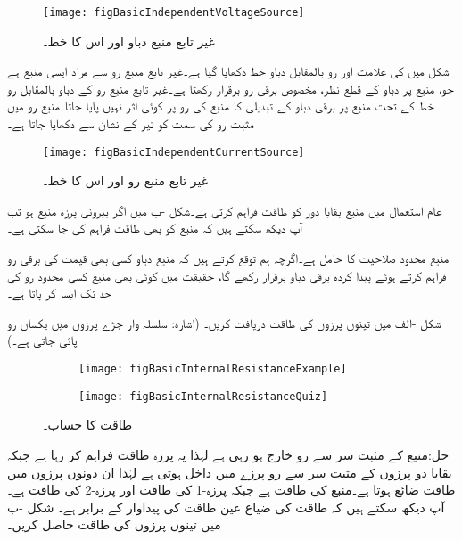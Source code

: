 \begin{figure}
\centering
\texttt{[image: figBasicIndependentVoltageSource]}
\caption{غیر تابع منبع دباو اور اس کا  خط۔}
\label{شکل_بنیادی_آزاد_منبع_دباو}
\end{figure}

شکل  میں  کی علامت اور رو بالمقابل دباو  خط دکھایا گیا ہے۔غیر تابع منبع رو سے مراد ایسی منبع ہے جو، منبع پر دباو کے قطع نظر،  مخصوص برقی رو برقرار رکھتا ہے۔غیر تابع منبع رو کے دباو بالمقابل رو خط کے تحت منبع پر برقی دباو کے تبدیلی کا منبع کی رو پر کوئی اثر نہیں پایا جاتا۔منبع رو میں مثبت رو کی سمت کو تیر کے نشان سے دکھایا جاتا ہے۔
\begin{figure}
\centering
\texttt{[image: figBasicIndependentCurrentSource]}
\caption{غیر تابع منبع رو اور اس کا  خط۔}
\label{شکل_بنیادی_آزاد_منبع_رو}
\end{figure}

عام استعمال میں منبع بقایا دور کو طاقت فراہم کرتی ہے۔شکل -ب میں اگر بیرونی پرزہ منبع ہو تب آپ دیکھ سکتے ہیں کہ منبع کو بھی طاقت فراہم کی جا سکتی ہے۔

منبع محدود صلاحیت کا حامل ہے۔اگرچہ ہم توقع کرتے ہیں کہ منبع دباو کسی بھی قیمت کی برقی رو فراہم کرتے ہوئے پیدا کردہ  برقی دباو برقرار رکھے گا، حقیقت میں کوئی بھی منبع کسی محدود رو کی حد تک ایسا کر پاتا ہے۔

شکل -الف میں تینوں پرزوں کی طاقت دریافت کریں۔ (اشارہ: سلسلہ وار جڑے پرزوں میں یکساں رو پائی جاتی ہے۔)
\begin{figure}
\centering
\begin{subfigure}{0.5\textwidth}
\centering
\texttt{[image: figBasicInternalResistanceExample]}
\caption{}
\end{subfigure}%
%
\begin{subfigure}{0.5\textwidth}
\centering
\texttt{[image: figBasicInternalResistanceQuiz]}
\caption{}
\end{subfigure}%
\caption{طاقت کا حساب۔}
\label{شکل_بنیادی_طاقت_حساب}
\end{figure}

حل:منبع کے مثبت سر سے رو خارج ہو رہی ہے لہٰذا یہ پرزہ طاقت فراہم کر رہا ہے جبکہ بقایا دو پرزوں کے مثبت سر سے رو پرزے میں داخل ہوتی ہے لہٰذا ان دونوں پرزوں میں طاقت ضائع ہوتا ہے۔منبع کی طاقت  ہے جبکہ پرزہ-1 کی طاقت  اور پرزہ-2 کی طاقت  ہے۔آپ دیکھ سکتے ہیں کہ طاقت کی ضیاع  عین طاقت کی پیداوار کے برابر ہے۔
شکل -ب میں تینوں پرزوں کی طاقت حاصل کریں۔

